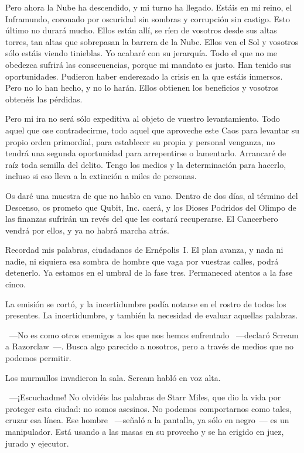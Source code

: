 \rquoti Pero ahora la Nube ha descendido, y mi turno ha llegado. Estáis en mi reino, el Inframundo, coronado por oscuridad sin sombras y corrupción sin castigo. Esto último no durará mucho. Ellos están allí, se ríen de vosotros desde sus altas torres, tan altas que sobrepasan la barrera de la Nube. Ellos ven el Sol y vosotros sólo estáis viendo tinieblas. Yo acabaré con su jerarquía. Todo el que no me obedezca sufrirá las consecuencias, porque mi mandato es justo. Han tenido sus oportunidades. Pudieron haber enderezado la crisis en la que estáis inmersos. Pero no lo han hecho, y no lo harán. Ellos obtienen los beneficios y vosotros obtenéis las pérdidas.

\rquoti Pero mi ira no será sólo expeditiva al objeto de vuestro levantamiento. Todo aquel que ose contradecirme, todo aquel que aproveche este Caos para levantar su propio orden primordial, para establecer su propia y personal venganza, no tendrá una segunda oportunidad para arrepentirse o lamentarlo. Arrancaré de raíz toda semilla del delito. Tengo los medios y la determinación para hacerlo, incluso si eso lleva a la extinción a miles de personas.

\rquoti Os daré una muestra de que no hablo en vano. Dentro de dos días, al término del Descenso, os prometo que Qubit, Inc. caerá, y los Dioses Podridos del Olimpo de las finanzas sufrirán un revés del que les costará recuperarse. El Cancerbero vendrá por ellos, y ya no habrá marcha atrás.

\rquoti Recordad mis palabras, ciudadanos de Ernépolis~I. El plan avanza, y nada ni nadie, ni siquiera esa sombra de hombre que vaga por vuestras calles, podrá detenerlo. Ya estamos en el umbral de la fase tres. Permaneced atentos a la fase cinco.

La emisión se cortó, y la incertidumbre podía notarse en el rostro de todos los presentes. La incertidumbre, y también la necesidad de evaluar aquellas palabras.

~---No es como otros enemigos a los que nos hemos enfrentado ~---declaró Scream a Razorclaw~---. Busca algo parecido a nosotros, pero a través de medios que no podemos permitir.

Los murmullos invadieron la sala. Scream habló en voz alta.

~---¡Escuchadme! No olvidéis las palabras de Starr Miles, que dio la vida por proteger esta ciudad: no somos asesinos. No podemos comportarnos como tales, cruzar esa línea. Ese hombre ~---señaló a la pantalla, ya sólo en negro~--- es un manipulador. Está usando a las masas en su provecho y se ha erigido en juez, jurado y ejecutor.

